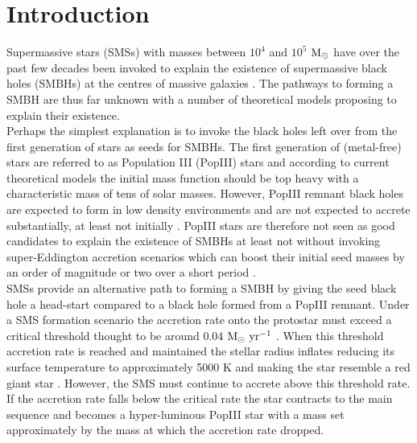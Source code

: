 \documentclass[graphics, twocolumn, usenatbib]{mn2e}
\newcommand{\msolar} {$\rm{M_{\odot}}~$}
\newcommand{\msolaryr} {$\rm{M_{\odot}~yr^{-1}}~$}
\begin{document}
\section{Introduction} \label{Sec:Introduction}
Supermassive stars (SMSs) with masses between $10^4$ and $10^5$ \msolar have over the past few decades been invoked \citep{Rees_1978, Begelman_1978, Begelman_2006,
  Begelman_2008, Latif_2016a, Woods_2018} to explain the existence of supermassive black holes (SMBHs) at the centres of massive galaxies \citep{Fan_06, Kormendy_2013}.
The pathways to forming a SMBH are thus far unknown with a number of theoretical models proposing to explain their existence. \\
\indent Perhaps the
simplest explanation is to invoke the black holes left over from the first 
generation of stars as seeds for SMBHs. The first generation of (metal-free) 
stars are referred to as Population III (PopIII) stars and according to 
current theoretical models \citep[e.g.][]{Turk_2009, Clark_2008, Hirano_2014, Stacy_2016} the initial mass function should be
top heavy with a characteristic mass of tens of solar masses. However, PopIII remnant black holes are expected to form in low
density environments \citep{Whalen_2004, OShea_2005b, Milosavljevic_2009} and are not expected to accrete substantially, at least not 
initially \citep{Alvarez_2009, Smith_2018}. PopIII stars are therefore not seen as good candidates to explain the existence
of SMBHs at least not without invoking super-Eddington accretion scenarios which can boost their initial 
seed masses by an order of magnitude or two over a short period
\citep{Lupi_2014, Pacucci_2015a, Sakurai_2016a,Inayoshi_2016, Pacucci_2017, Inayoshi_2018}.\\
\indent SMSs provide an alternative path to forming a SMBH by giving the seed black hole a
head-start compared to a black hole formed from a PopIII remnant. Under a SMS formation scenario
the accretion rate onto the protostar must exceed a critical threshold thought to be around
0.04 \msolaryr \citep{Sakurai_2016}. When
this threshold accretion rate is reached and maintained the stellar radius inflates reducing
its surface temperature to approximately 5000 K
and making the star resemble a red giant star
\citep{Omukai_2003, Hosokawa_2012, Hosokawa_2013, Woods_2017}. However, the SMS must continue to
accrete above this threshold rate. If the accretion rate falls below the critical
rate the star contracts to the main sequence and becomes a hyper-luminous PopIII
star with a mass set approximately by the mass at which the accretion rate dropped.
\end{document}
